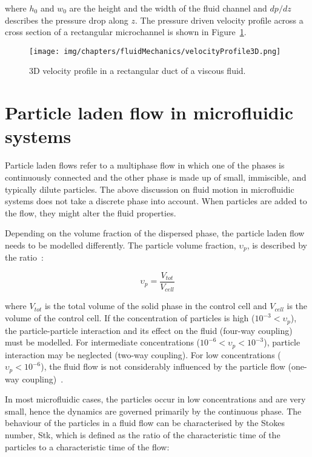 where $h_{0}$ and $w_{0}$ are the height and the width of the fluid channel and $dp/dz$ describes the pressure drop along $z$. The pressure driven velocity profile across a cross section of a rectangular microchannel is shown in Figure~\ref{fig:velocityProfile3D}.

\begin{figure}[htb]
	\centering
   \texttt{[image: img/chapters/fluidMechanics/velocityProfile3D.png]}
	\caption[3D velocity profile in a rectangular duct]{3D velocity profile in a rectangular duct of a viscous fluid.}
\label{fig:velocityProfile3D}%
\end{figure}

\section{Particle laden flow in microfluidic systems}\label{sec:particleLadenFlowInMicrofluidicSystems}
Particle laden flows refer to a multiphase flow in which one of the phases is continuously connected and the other phase is made up of small, immiscible, and typically dilute particles. The above discussion on fluid motion in microfluidic systems does not take a discrete phase into account. When particles are added to the flow, they might alter the fluid properties. 

Depending on the volume fraction of the dispersed phase, the particle laden flow needs to be modelled differently. The particle volume fraction, $\upsilon_{p}$, is described by the ratio~\cite{Elghobashi1994}:

\begin{equation}
	\upsilon_{p} = \frac{V_{tot}}{V_{cell}}
\end{equation}

where $V_{tot}$ is the total volume of the solid phase in the control cell and $V_{cell}$ is the volume of the control cell. If the concentration of particles is high ($10^{-3} < \upsilon_{p}$), the particle-particle interaction and its effect on the fluid (four-way coupling) must be modelled. For intermediate concentrations ($10^{-6} < \upsilon_{p} < 10^{-3}$), particle interaction may be neglected (two-way coupling). For low concentrations ($\upsilon_{p} < 10^{-6}$), the fluid flow is not considerably influenced by the particle flow (one-way coupling)~\cite{Hryb2009}.

In most microfluidic cases, the particles occur in low concentrations and are very small, hence the dynamics are governed primarily by the continuous phase. The behaviour of the particles in a fluid flow can be characterised by the Stokes number, Stk, which is defined as the ratio of the characteristic time of the particles to a characteristic time of the flow:

